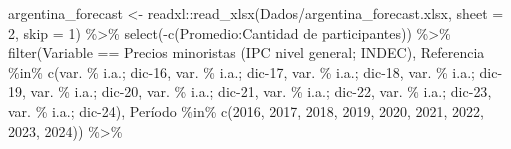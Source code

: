 \documentclass[
]{article}
\newenvironment{Shaded}{\begin{snugshade}}{\end{snugshade}}
\newcommand{\AttributeTok}[1]{\textcolor[rgb]{0.77,0.63,0.00}{#1}}
\newcommand{\DecValTok}[1]{\textcolor[rgb]{0.00,0.00,0.81}{#1}}
\newcommand{\FunctionTok}[1]{\textcolor[rgb]{0.00,0.00,0.00}{#1}}
\newcommand{\NormalTok}[1]{#1}
\newcommand{\OtherTok}[1]{\textcolor[rgb]{0.56,0.35,0.01}{#1}}
\newcommand{\SpecialCharTok}[1]{\textcolor[rgb]{0.00,0.00,0.00}{#1}}
\newcommand{\StringTok}[1]{\textcolor[rgb]{0.31,0.60,0.02}{#1}}
\begin{document}
\begin{Shaded}
\begin{Highlighting}[]
\NormalTok{argentina\_forecast }\OtherTok{\textless{}{-}}\NormalTok{ readxl}\SpecialCharTok{::}\FunctionTok{read\_xlsx}\NormalTok{(}\StringTok{\textquotesingle{}Dados/argentina\_forecast.xlsx\textquotesingle{}}\NormalTok{, }
                                        \AttributeTok{sheet =} \DecValTok{2}\NormalTok{,}
                                        \AttributeTok{skip =} \DecValTok{1}\NormalTok{) }\SpecialCharTok{\%\textgreater{}\%} 
  \FunctionTok{select}\NormalTok{(}\SpecialCharTok{{-}}\FunctionTok{c}\NormalTok{(Promedio}\SpecialCharTok{:}\StringTok{\textasciigrave{}}\AttributeTok{Cantidad de participantes}\StringTok{\textasciigrave{}}\NormalTok{)) }\SpecialCharTok{\%\textgreater{}\%} 
  \FunctionTok{filter}\NormalTok{(Variable }\SpecialCharTok{==} \StringTok{\textquotesingle{}Precios minoristas (IPC nivel general; INDEC)\textquotesingle{}}\NormalTok{,}
\NormalTok{         Referencia }\SpecialCharTok{\%in\%} \FunctionTok{c}\NormalTok{(}\StringTok{\textquotesingle{}var. \% i.a.; dic{-}16\textquotesingle{}}\NormalTok{, }\StringTok{\textquotesingle{}var. \% i.a.; dic{-}17\textquotesingle{}}\NormalTok{, }
                           \StringTok{\textquotesingle{}var. \% i.a.; dic{-}18\textquotesingle{}}\NormalTok{, }\StringTok{\textquotesingle{}var. \% i.a.; dic{-}19\textquotesingle{}}\NormalTok{,}
                           \StringTok{\textquotesingle{}var. \% i.a.; dic{-}20\textquotesingle{}}\NormalTok{, }\StringTok{\textquotesingle{}var. \% i.a.; dic{-}21\textquotesingle{}}\NormalTok{,}
                           \StringTok{\textquotesingle{}var. \% i.a.; dic{-}22\textquotesingle{}}\NormalTok{, }\StringTok{\textquotesingle{}var. \% i.a.; dic{-}23\textquotesingle{}}\NormalTok{,}
                           \StringTok{\textquotesingle{}var. \% i.a.; dic{-}24\textquotesingle{}}\NormalTok{),}
\NormalTok{         Período }\SpecialCharTok{\%in\%} \FunctionTok{c}\NormalTok{(}\StringTok{\textquotesingle{}2016\textquotesingle{}}\NormalTok{, }\StringTok{\textquotesingle{}2017\textquotesingle{}}\NormalTok{, }\StringTok{\textquotesingle{}2018\textquotesingle{}}\NormalTok{, }\StringTok{\textquotesingle{}2019\textquotesingle{}}\NormalTok{,}
                        \StringTok{\textquotesingle{}2020\textquotesingle{}}\NormalTok{, }\StringTok{\textquotesingle{}2021\textquotesingle{}}\NormalTok{, }\StringTok{\textquotesingle{}2022\textquotesingle{}}\NormalTok{, }\StringTok{\textquotesingle{}2023\textquotesingle{}}\NormalTok{, }\StringTok{\textquotesingle{}2024\textquotesingle{}}\NormalTok{)) }\SpecialCharTok{\%\textgreater{}\%} 

\end{Highlighting}
\end{Shaded}
\end{document}
